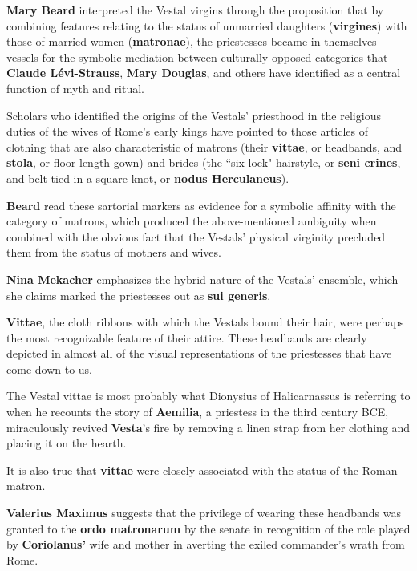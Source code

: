 \textbf{Mary Beard} interpreted the Vestal virgins through the proposition that by combining features relating to the status of unmarried daughters (\textbf{virgines}) with those of married women (\textbf{matronae}), the priestesses became in themselves vessels for the symbolic mediation between culturally opposed categories that \textbf{Claude L\'{e}vi-Strauss}, \textbf{Mary Douglas}, and others have identified as a central function of myth and ritual. 

Scholars who identified the origins of the Vestals' priesthood in the religious duties of the wives of Rome's early kings have pointed to those articles of clothing that are also characteristic of matrons (their \textbf{vittae}, or headbands, and \textbf{stola}, or floor-length gown) and brides (the ``six-lock" hairstyle, or \textbf{seni crines}, and belt tied in a square knot, or \textbf{nodus Herculaneus}).

\begin{rmk}
    \textbf{Beard} read these sartorial markers as evidence for a symbolic affinity with the category of matrons, which produced the above-mentioned ambiguity when combined with the obvious fact that the Vestals' physical virginity precluded them from the status of mothers and wives.
\end{rmk}

\textbf{Nina Mekacher} emphasizes the hybrid nature of the Vestals' ensemble, which she claims marked the priestesses out as \textbf{sui generis}.

\begin{rmk}
    \textbf{Vittae}, the cloth ribbons with which the Vestals bound their hair, were perhaps the most recognizable feature of their attire. These headbands are clearly depicted in almost all of the visual representations of the priestesses that have come down to us.
\end{rmk}

The Vestal vittae is most probably what Dionysius of Halicarnassus is referring to when he recounts the story of \textbf{Aemilia}, a priestess in the third century BCE, miraculously revived \textbf{Vesta}'s fire by removing a linen strap from her clothing and placing it on the hearth.

It is also true that \textbf{vittae} were closely associated with the status of the Roman matron.

\begin{rmk}
    \textbf{Valerius Maximus} suggests that the privilege of wearing these headbands was granted to the \textbf{ordo matronarum} by the senate in recognition of the role played by \textbf{Coriolanus'} wife and mother in averting the exiled commander's wrath from Rome.
\end{rmk}

